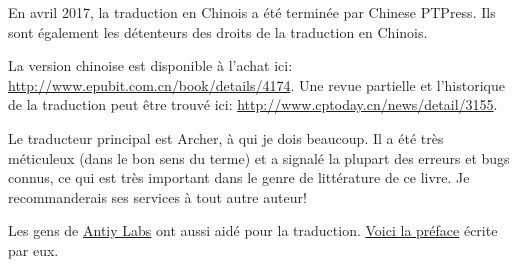 En avril 2017, la traduction en Chinois a été terminée par Chinese PTPress. Ils sont
également les détenteurs des droits de la traduction en Chinois.

La version chinoise est disponible à l'achat ici: \url{http://www.epubit.com.cn/book/details/4174}.
Une revue partielle et l'historique de la traduction peut être trouvé ici: \url{http://www.cptoday.cn/news/detail/3155}.


Le traducteur principal est Archer, à qui je dois beaucoup. Il a été très méticuleux
(dans le bon sens du terme) et a signalé la plupart des erreurs et bugs connus, ce
qui est très important dans le genre de littérature de ce livre.
Je recommanderais ses services à tout autre auteur!

Les gens de \href{http://www.antiy.net/}{Antiy Labs} ont aussi aidé pour la traduction.
\href{http://www.epubit.com.cn/book/onlinechapter/51413}{Voici la préface} écrite par eux.


